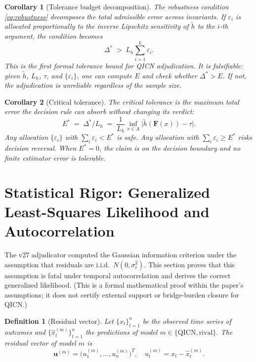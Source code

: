 \documentclass[11pt]{article}
\newtheorem{definition}{Definition}
\newtheorem{corollary}{Corollary}
\begin{document}
\begin{corollary}[Tolerance budget decomposition]
The robustness condition \eqref{eq:robustness} decomposes the total admissible error across invariants. If $\varepsilon_i$ is allocated proportionally to the inverse Lipschitz sensitivity of $\tilde{h}$ to the $i$-th argument, the condition becomes
\[
\Delta^{*}\;>\;L_h\sum_{i=1}^k\varepsilon_i.
\]
This is the first formal tolerance bound for QICN adjudication. It is falsifiable: given $\tilde{h}$, $L_h$, $\tau$, and $\{\varepsilon_i\}$, one can compute $E$ and check whether $\Delta^{*}>E$. If not, the adjudication is unreliable regardless of the sample size.
\end{corollary}

\begin{corollary}[Critical tolerance]
The \emph{critical tolerance} is the maximum total error the decision rule can absorb without changing its verdict:
\[
E^{*}\;=\;\Delta^{*}/L_h\;=\;\frac{1}{L_h}\inf_{x\in A}\bigl|\tilde{h}(\mathbf{F}(x))-\tau\bigr|.
\]
Any allocation $\{\varepsilon_i\}$ with $\sum_i\varepsilon_i<E^{*}$ is safe. Any allocation with $\sum_i\varepsilon_i\geq E^{*}$ risks decision reversal. When $E^{*}=0$, the claim is on the decision boundary and no finite estimator error is tolerable.
\end{corollary}

\section{Statistical Rigor: Generalized Least-Squares Likelihood and Autocorrelation}
\label{sec:gls}

The v27 adjudicator computed the Gaussian information criterion under the assumption that residuals are i.i.d.\ $N(0,\sigma_t^2)$. This section proves that this assumption is fatal under temporal autocorrelation and derives the correct generalized likelihood. (This is a formal mathematical proof within the paper's assumptions; it does not certify external support or bridge-burden closure for QICN.)

\begin{definition}[Residual vector]
Let $\{x_t\}_{t=1}^n$ be the observed time series of outcomes and $\{\hat{x}_t^{(m)}\}_{t=1}^n$ the predictions of model $m\in\{\text{QICN},\text{rival}\}$. The \emph{residual vector} of model $m$ is
\[
\bm{u}^{(m)}=\bigl(u_1^{(m)},\ldots,u_n^{(m)}\bigr)^T,\quad u_t^{(m)}=x_t-\hat{x}_t^{(m)}.
\]
\end{definition}
\end{document}
